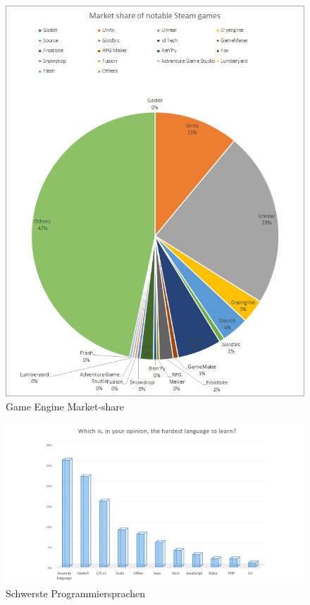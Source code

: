 \begin{figure}
    \includegraphics[scale=0.5]{pics/game_engine_marketshare}
    \caption{Game Engine Market-share}
    \label{fig:game_engine_marketshare}
\end{figure}

\begin{figure}
    \includegraphics[scale=0.5]{pics/programming_languages_hardest}
    \caption{Schwerste Programmiersprachen}
    \label{fig:hardest_programming_languages}
\end{figure}

